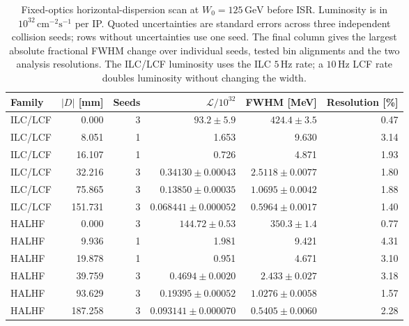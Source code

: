 \begin{table}[htbp]
\centering\small
\caption{Fixed-optics horizontal-dispersion scan at $W_0=125\,\mathrm{GeV}$ before ISR. Luminosity is in $10^{32}\,\mathrm{cm}^{-2}\mathrm{s}^{-1}$ per IP. Quoted uncertainties are standard errors across three independent collision seeds; rows without uncertainties use one seed. The final column gives the largest absolute fractional FWHM change over individual seeds, tested bin alignments and the two analysis resolutions. The ILC/LCF luminosity uses the ILC $5\,\mathrm{Hz}$ rate; a $10\,\mathrm{Hz}$ LCF rate doubles luminosity without changing the width.}
\label{tab:highd}
\begin{tabular}{@{}lrrrrr@{}}
\toprule
Family & $|D|$ [mm] & Seeds & $\mathcal L/10^{32}$ & FWHM [MeV] & Resolution [\%]\\
\midrule
ILC/LCF & 0.000 & 3 & $93.2\pm5.9$ & $424.4\pm3.5$ & 0.47\\
ILC/LCF & 8.051 & 1 & 1.653 & 9.630 & 3.14\\
ILC/LCF & 16.107 & 1 & 0.726 & 4.871 & 1.93\\
ILC/LCF & 32.216 & 3 & $0.34130\pm0.00043$ & $2.5118\pm0.0077$ & 1.80\\
ILC/LCF & 75.865 & 3 & $0.13850\pm0.00035$ & $1.0695\pm0.0042$ & 1.88\\
ILC/LCF & 151.731 & 3 & $0.068441\pm0.000052$ & $0.5964\pm0.0017$ & 1.40\\
HALHF & 0.000 & 3 & $144.72\pm0.53$ & $350.3\pm1.4$ & 0.77\\
HALHF & 9.936 & 1 & 1.981 & 9.421 & 4.31\\
HALHF & 19.878 & 1 & 0.951 & 4.671 & 3.10\\
HALHF & 39.759 & 3 & $0.4694\pm0.0020$ & $2.433\pm0.027$ & 3.18\\
HALHF & 93.629 & 3 & $0.19395\pm0.00052$ & $1.0276\pm0.0058$ & 1.57\\
HALHF & 187.258 & 3 & $0.093141\pm0.000070$ & $0.5405\pm0.0060$ & 2.28\\
\bottomrule
\end{tabular}
\end{table}
